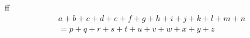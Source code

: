 \documentclass{article}
\begin{document}
ff
\begin{multline}
a + b + c + d + e + f + g + h + i + j + k + l + m + n \\
= p + q + r + s + t + u + v + w + x + y + z \label{eq:multline}
\end{multline}
\end{document}
